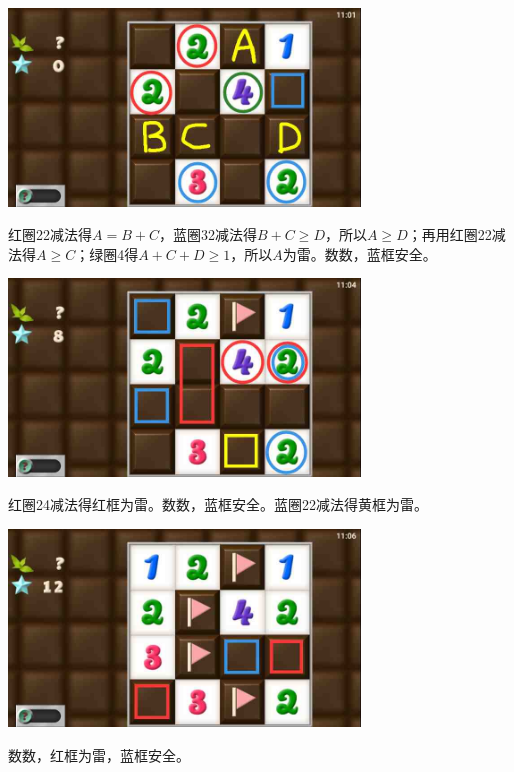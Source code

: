 \subsection{} %
\begin{center}
    \includegraphics[width=0.7\textwidth]{puzzlelow/190-1.jpg}
\end{center}
红圈22减法得$A=B+C$，蓝圈32减法得$B+C\ge D$，所以$A\ge D$；再用红圈22减法得$A\ge C$；绿圈4得$A+C+D\ge 1$，所以$A$为雷。数数，蓝框安全。
\begin{center}
    \includegraphics[width=0.7\textwidth]{puzzlelow/190-2.jpg}
\end{center}
红圈24减法得红框为雷。数数，蓝框安全。蓝圈22减法得黄框为雷。
\begin{center}
    \includegraphics[width=0.7\textwidth]{puzzlelow/190-3.jpg}
\end{center}
数数，红框为雷，蓝框安全。

